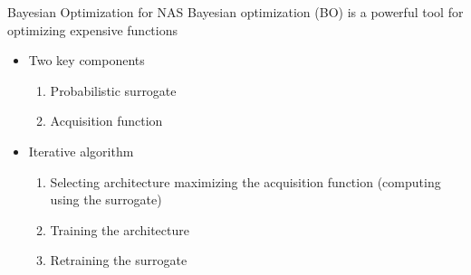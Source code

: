 \documentclass[main]{subfiles}
\begin{document}
\begin{frame}{Bayesian Optimization for NAS}
Bayesian optimization (BO) is a powerful tool for optimizing expensive functions
\pause
\begin{itemize}
    \item Two key components
    \begin{enumerate}
        \item Probabilistic surrogate
        \item Acquisition function
    \end{enumerate}
    \pause
    \item Iterative algorithm
    \begin{enumerate}
        \item Selecting architecture maximizing the acquisition function (computing  using the surrogate)
        \item Training the architecture
        \item Retraining the surrogate
    \end{enumerate}
\end{itemize}
\end{frame}

\end{document}
